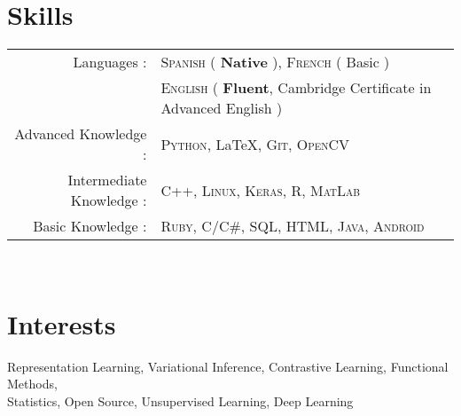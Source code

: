 \documentclass[a4paper,10pt]{article} %
\begin{document}
\section{Skills}

\begin{tabular}{rl}

  Languages : & \textsc{Spanish} ( \textbf{Native} ), \textsc{French} ( Basic ) \\
  & \textsc{English} ( \textbf{Fluent}, Cambridge Certificate in Advanced English ) \\


Advanced Knowledge : & \textsc{Python}, { \LaTeX}\setmainfont[SmallCapsFont=Fontin SmallCaps]{Fontin-Regular}, \textsc{Git}, \textsc{OpenCV}\\

Intermediate Knowledge : &  \textsc{C++},  \textsc{Linux}, \textsc{Keras}, \textsc{R}, \textsc{MatLab} \\

Basic Knowledge : & \textsc{Ruby}, \textsc{C/C\#},  \textsc{SQL}, \textsc{HTML}, \textsc{Java}, \textsc{Android}\\


\end{tabular}\\


\section{Interests}

Representation Learning, Variational Inference, Contrastive Learning, Functional Methods, \\
Statistics, Open Source, Unsupervised Learning, Deep Learning
\end{document}
